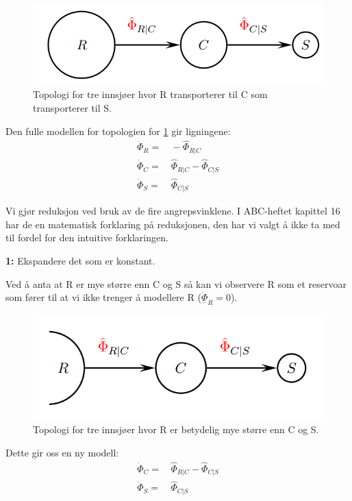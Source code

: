\begin{figure}[H]
    \centering
    \includegraphics[scale=0.5]{Figures/time_scale_topo}
    \caption{Topologi for tre innsjøer hvor R transporterer til C som transporterer til S.}
    \label{fig:time_scale_topo}
\end{figure}

Den fulle modellen for topologien for \cref{fig:time_scale_topo} gir ligningene:
\begin{align}
    \dot{\Phi}_{R} =&\, -\hat{\Phi}_{R|C} \\
    \dot{\Phi}_C =&\, \hat{\Phi}_{R|C} - \hat{\Phi}_{C|S}\\
    \dot{\Phi}_S =&\, \hat{\Phi}_{C|S}
\end{align}

Vi gjør reduksjon ved bruk av de fire angrepsvinklene. I ABC-heftet kapittel 16 har de en matematisk forklaring på reduksjonen, den har vi valgt å ikke ta med til fordel for den intuitive forklaringen.  

\begin{center}
    \textbf{1:} Ekspandere det som er konstant.
\end{center}
Ved å anta at R er mye større enn C og S så kan vi observere R som et reservoar som fører til at vi ikke trenger å modellere R ($\underline{\dot{\Phi}}_R = 0$).

\begin{figure}[H]
    \centering
    \includegraphics[scale=0.5]{Figures/time_scale_topo1.png}
    \caption{Topologi for tre innsjøer hvor R er betydelig mye større enn C og S.}
    \label{fig:time_scale_topo1}
\end{figure}
Dette gir oss en ny modell:
\begin{align}
    \dot{\Phi}_C =&\, \hat{\Phi}_{R|C} - \hat{\Phi}_{C|S}\\
    \dot{\Phi}_S =&\, \hat{\Phi}_{C|S}
\end{align}


